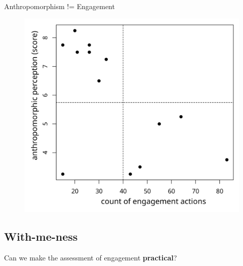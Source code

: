 \documentclass[compress]{beamer}
\begin{document}
{
\begin{frame}{Anthropomorphism != Engagement}

\begin{figure}
    \hspace*{5cm}\includegraphics[width=0.6\linewidth]{ranger/domino-correlation}
\end{figure}
\end{frame}
}

\subsection{With-me-ness}

\begin{frame}{}

    \begin{center}
        Can we make the assessment of engagement {\bf practical}?

    \end{center}

\end{frame}

\end{document}
